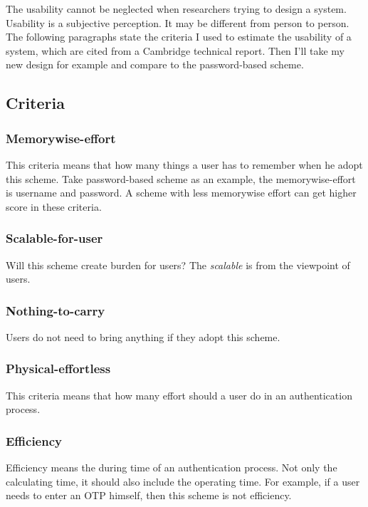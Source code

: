 \begin{CJK}{Bg5}{bsmi}
The usability cannot be neglected when researchers trying to design a system.
Usability is a subjective perception. It may be different from person to person.
The following paragraphs state the criteria I used to estimate the usability of a system, which are cited from a Cambridge technical report\cite{password-extended}. Then I'll take my new design for example and compare to the password-based scheme.

\subsection{Criteria}

\subsubsection{Memorywise-effort}

This criteria means that how many things a user has to remember when he adopt this scheme. Take password-based scheme as an example, the memorywise-effort is username and password. A scheme with less memorywise effort can get higher score in these criteria.

\subsubsection{Scalable-for-user}

Will this scheme create burden for users? The \emph{scalable} is from the viewpoint of users.

\subsubsection{Nothing-to-carry}

Users do not need to bring anything if they adopt this scheme.

\subsubsection{Physical-effortless}

This criteria means that how many effort should a user do in an authentication process.

\subsubsection{Efficiency}

Efficiency means the during time of an authentication process. Not only the calculating time, it should also include the operating time. For example, if a user needs to enter an OTP himself, then this scheme is not efficiency.


\end{CJK}
